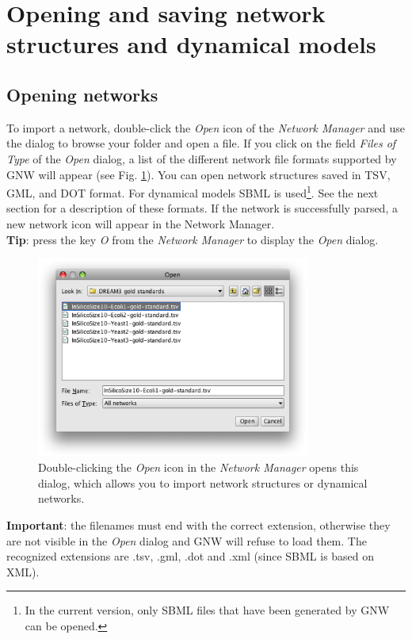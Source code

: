 \documentclass{llncs}
\begin{document}
\section{Opening and saving network structures and dynamical models}
\label{opensave}

\subsection{Opening networks}

To import a network, double-click the \emph{Open} icon of the \emph{Network Manager} and use the dialog to browse your folder and open a file. If you click on the field \emph{Files of Type} of the \emph{Open} dialog, a list of the different network file formats supported by GNW will appear (see Fig. \ref{opendialog}). You can open network structures saved in TSV, GML, and DOT format. For dynamical models SBML is used\footnote{In the current version, only SBML files that have been generated by GNW can be opened.}. See the next section for a description of these formats. If the network is successfully parsed, a new network icon will appear in the Network Manager.\\

\textbf{Tip}: press the key \emph{O} from the \emph{Network Manager} to display the \emph{Open} dialog.\\

\begin{figure}[tbh]
\label{opendialog}
\centering\includegraphics[width=9cm]{figures/open-dialog}
\caption{Double-clicking the \emph{Open} icon in the \emph{Network Manager} opens this dialog, which allows you to import network structures or dynamical networks.}
\end{figure}

\textbf{Important}: the filenames must end with the correct extension, otherwise they are not visible in the \emph{Open} dialog and GNW will refuse to load them. The recognized extensions are .tsv, .gml, .dot and .xml (since SBML is based on XML).
\end{document}
